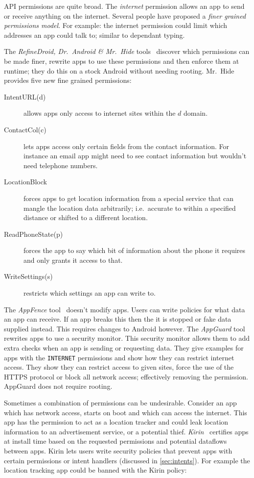 \documentclass[a4paper,sfsidenotes]{%
  article%
}
\begin{document}
API permissions are quite broad. 
The \emph{internet} permission allows an app to send or receive anything on the
internet. Several people have proposed a \emph{finer grained permissions model}.
For example: the internet permission could limit which addresses an app could
talk to; similar to dependant typing.

The \emph{RefineDroid, Dr.~Android \& Mr.~Hide} tools~\cite{Jeon:2012ki} discover
which permissions can be made finer, rewrite apps to use these permissions and
then enforce them at runtime; they do this on a stock Android without needing
rooting.  Mr.\ Hide provides five new fine grained permissions:

\begin{description}
  \item[IntentURL(d)] allows apps only access to internet sites within the
    $d$ domain.
  \item[ContactCol(c)] lets apps access only certain fields from the contact
    information.  For instance an email app might need to see contact
    information but wouldn't need telephone numbers.
  \item[LocationBlock] forces apps to get location information from a special
    service that can mangle the location data arbitrarily; i.e.\ accurate to within
    a specified distance or shifted to a different location.
  \item[ReadPhoneState(p)] forces the app to say which bit of information about
    the phone it requires and only grants it access to that.
  \item[WriteSettings(s)] restricts which settings an app can write to.
\end{description}

The \emph{AppFence} tool~\cite{Hornyack:2011wq} doesn't modify apps.  Users can
write policies for what data an app can receive. If an app breaks this then the
it is stopped or fake data supplied instead.  This requires changes to Android
however. The \emph{AppGuard} tool~\cite{Backes:2012vm} rewrites
apps to use a security monitor.  This security monitor allows them to add extra
checks when an app is sending or requesting data.  They give examples for apps
with the \texttt{INTERNET} permissions and show how they can restrict internet
access.  They show they can restrict access to given sites, force the use of the
HTTPS protocol or block all network access; effectively removing the permission.
AppGuard does not require rooting.

Sometimes a combination of permissions can be undesirable.  Consider an app
which has network access, starts on boot and which can access the internet.
This app has the permission to act as a location tracker and could leak location
information to an advertisement service, or a potential thief.
\emph{Kirin}~\cite{Enck:2009ko} certifies apps at install time based on
the requested permissions and potential dataflows between apps.
Kirin lets users write security policies that prevent apps with certain
permissions or intent handlers (discussed in \autoref{sec:intents}).  For
example the location tracking app could be banned with the Kirin policy:
\end{document}
